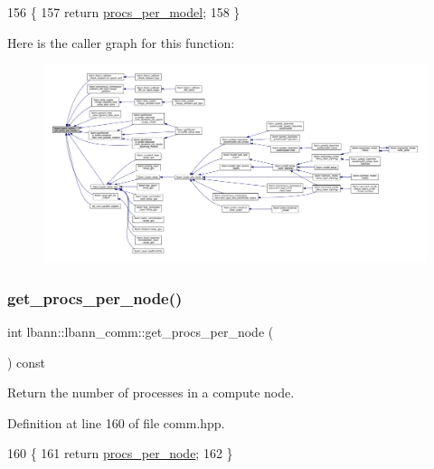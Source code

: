 \begin{DoxyCode}
156                                          \{
157     \textcolor{keywordflow}{return} \hyperlink{classlbann_1_1lbann__comm_a7cb55d127259d7ed9f07ccde6f4ebd8c}{procs\_per\_model};
158   \}
\end{DoxyCode}
Here is the caller graph for this function\+:\nopagebreak
\begin{figure}[H]
\begin{center}
\leavevmode
\includegraphics[width=350pt]{classlbann_1_1lbann__comm_a5755dfdfc6377b4cae5ef8f7819e17de_icgraph}
\end{center}
\end{figure}
\mbox{\label{classlbann_1_1lbann__comm_ac5ccd63337b0cbb2fd730fddd9f8da3e}} 
\subsubsection{\texorpdfstring{get\+\_\+procs\+\_\+per\+\_\+node()}{get\_procs\_per\_node()}}
{\footnotesize\ttfamily int lbann\+::lbann\+\_\+comm\+::get\+\_\+procs\+\_\+per\+\_\+node (\begin{DoxyParamCaption}{ }\end{DoxyParamCaption}) const\hspace{0.3cm}{\ttfamily [inline]}}

Return the number of processes in a compute node. 

Definition at line 160 of file comm.\+hpp.


\begin{DoxyCode}
160                                         \{
161     \textcolor{keywordflow}{return} \hyperlink{classlbann_1_1lbann__comm_a2ffc59f0c1d97df2ca6845312c8c8b3e}{procs\_per\_node};
162   \}
\end{DoxyCode}
\mbox{\label{classlbann_1_1lbann__comm_a789453454468a3b70de768537c50ca52}} 
